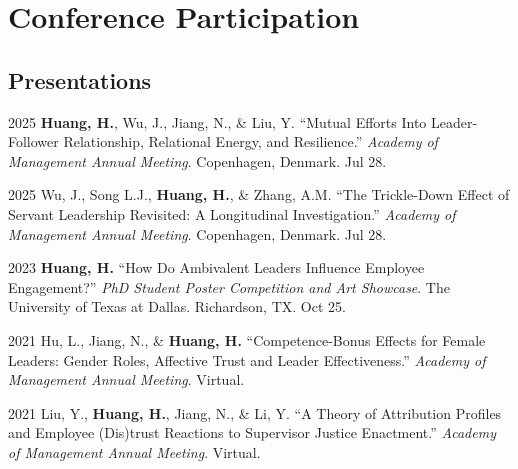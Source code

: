 \documentclass[12pt,letterpaper]{report} %
\begin{document}



    \section*{Conference Participation}

    \subsection*{Presentations}
    
    \begin{tablist}

        \item[2025]\tab{}\textbf{Huang, H.}, Wu, J., Jiang, N., \& Liu, Y. \enquote{Mutual Efforts Into Leader-Follower Relationship, Relational Energy, and Resilience.} \textit{Academy of Management Annual Meeting}. Copenhagen, Denmark. Jul 28.
        
        \item[2025]\tab{}Wu, J., Song L.J., \textbf{Huang, H.}, \& Zhang, A.M. \enquote{The Trickle-Down Effect of Servant Leadership Revisited: A Longitudinal Investigation.} \textit{Academy of Management Annual Meeting}. Copenhagen, Denmark. Jul 28.
    
        \item[2023]\tab{}\textbf{Huang, H.} \enquote{How Do Ambivalent Leaders Influence Employee Engagement?} \textit{PhD Student Poster Competition and Art Showcase}. The University of Texas at Dallas. Richardson, TX. Oct 25.

        \item[2021]\tab{}Hu, L., Jiang, N., \& \textbf{Huang, H.} \enquote{Competence-Bonus Effects for Female Leaders: Gender Roles, Affective Trust and Leader Effectiveness.} \textit{Academy of Management Annual Meeting}. Virtual. 
        
        \item[2021]\tab{}Liu, Y., \textbf{Huang, H.}, Jiang, N., \& Li, Y. \enquote{A Theory of Attribution Profiles and Employee (Dis)trust Reactions to Supervisor Justice Enactment.} \textit{Academy of Management Annual Meeting}. Virtual. 

    \end{tablist}
\end{document}

